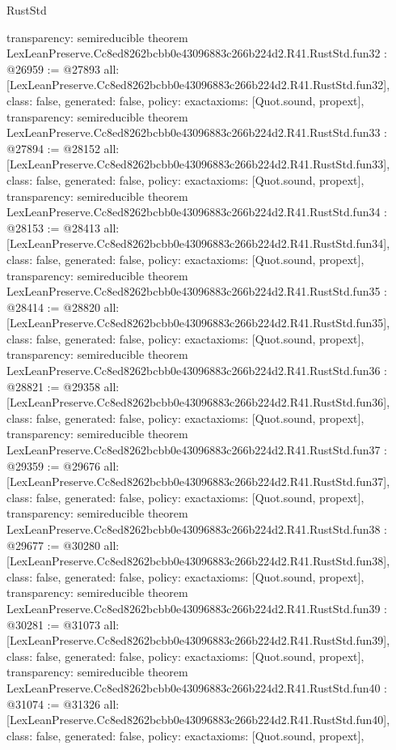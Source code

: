 \begin{lexlean}{RustStd}
\begin{coremodule}
{  transparency: semireducible
}
theorem LexLeanPreserve.Cc8ed8262bcbb0e43096883c266b224d2.R41.RustStd.fun32 : @26959 := @27893 {
  all: [LexLeanPreserve.Cc8ed8262bcbb0e43096883c266b224d2.R41.RustStd.fun32],
  class: false,
  generated: false,
  policy: exact{axioms: [Quot.sound, propext]},
  transparency: semireducible
}
theorem LexLeanPreserve.Cc8ed8262bcbb0e43096883c266b224d2.R41.RustStd.fun33 : @27894 := @28152 {
  all: [LexLeanPreserve.Cc8ed8262bcbb0e43096883c266b224d2.R41.RustStd.fun33],
  class: false,
  generated: false,
  policy: exact{axioms: [Quot.sound, propext]},
  transparency: semireducible
}
theorem LexLeanPreserve.Cc8ed8262bcbb0e43096883c266b224d2.R41.RustStd.fun34 : @28153 := @28413 {
  all: [LexLeanPreserve.Cc8ed8262bcbb0e43096883c266b224d2.R41.RustStd.fun34],
  class: false,
  generated: false,
  policy: exact{axioms: [Quot.sound, propext]},
  transparency: semireducible
}
theorem LexLeanPreserve.Cc8ed8262bcbb0e43096883c266b224d2.R41.RustStd.fun35 : @28414 := @28820 {
  all: [LexLeanPreserve.Cc8ed8262bcbb0e43096883c266b224d2.R41.RustStd.fun35],
  class: false,
  generated: false,
  policy: exact{axioms: [Quot.sound, propext]},
  transparency: semireducible
}
theorem LexLeanPreserve.Cc8ed8262bcbb0e43096883c266b224d2.R41.RustStd.fun36 : @28821 := @29358 {
  all: [LexLeanPreserve.Cc8ed8262bcbb0e43096883c266b224d2.R41.RustStd.fun36],
  class: false,
  generated: false,
  policy: exact{axioms: [Quot.sound, propext]},
  transparency: semireducible
}
theorem LexLeanPreserve.Cc8ed8262bcbb0e43096883c266b224d2.R41.RustStd.fun37 : @29359 := @29676 {
  all: [LexLeanPreserve.Cc8ed8262bcbb0e43096883c266b224d2.R41.RustStd.fun37],
  class: false,
  generated: false,
  policy: exact{axioms: [Quot.sound, propext]},
  transparency: semireducible
}
theorem LexLeanPreserve.Cc8ed8262bcbb0e43096883c266b224d2.R41.RustStd.fun38 : @29677 := @30280 {
  all: [LexLeanPreserve.Cc8ed8262bcbb0e43096883c266b224d2.R41.RustStd.fun38],
  class: false,
  generated: false,
  policy: exact{axioms: [Quot.sound, propext]},
  transparency: semireducible
}
theorem LexLeanPreserve.Cc8ed8262bcbb0e43096883c266b224d2.R41.RustStd.fun39 : @30281 := @31073 {
  all: [LexLeanPreserve.Cc8ed8262bcbb0e43096883c266b224d2.R41.RustStd.fun39],
  class: false,
  generated: false,
  policy: exact{axioms: [Quot.sound, propext]},
  transparency: semireducible
}
theorem LexLeanPreserve.Cc8ed8262bcbb0e43096883c266b224d2.R41.RustStd.fun40 : @31074 := @31326 {
  all: [LexLeanPreserve.Cc8ed8262bcbb0e43096883c266b224d2.R41.RustStd.fun40],
  class: false,
  generated: false,
  policy: exact{axioms: [Quot.sound, propext]},
}
\end{coremodule}
\end{lexlean}
